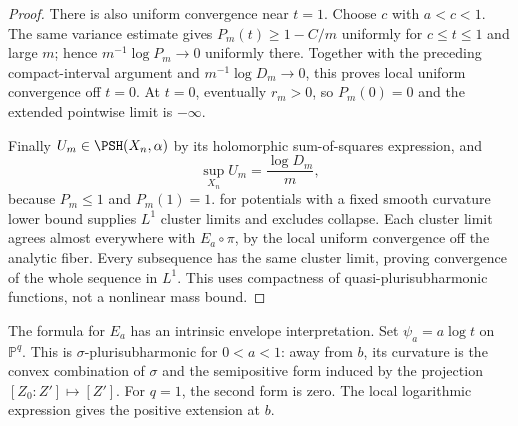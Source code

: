 \begin{proof}
There is also uniform convergence near $t=1$. Choose $c$ with $a<c<1$. The same variance estimate gives $P_m(t)\geq1-C/m$ uniformly for $c\leq t\leq1$ and large $m$; hence $m^{-1}\log P_m\to0$ uniformly there. Together with the preceding compact-interval argument and $m^{-1}\log D_m\to0$, this proves local uniform convergence off $t=0$. At $t=0$, eventually $r_m>0$, so $P_m(0)=0$ and the extended pointwise limit is $-\infty$.

Finally $U_m\in\PSH(X_n,\alpha)$ by its holomorphic sum-of-squares expression, and
\[
 \sup_{X_n}U_m=\frac{\log D_m}{m},
\]
because $P_m\leq1$ and $P_m(1)=1$.  for potentials with a fixed smooth curvature lower bound supplies $L^1$ cluster limits and excludes collapse. Each cluster limit agrees almost everywhere with $E_a\circ\pi$, by the local uniform convergence off the analytic fiber. Every subsequence has the same cluster limit, proving convergence of the whole sequence in $L^1$. This uses compactness of quasi-plurisubharmonic functions, not a nonlinear mass bound.
\end{proof}

The formula for $E_a$ has an intrinsic envelope interpretation. Set $\psi_a=a\log t$ on $\mathbb P^q$. This is $\sigma$-plurisubharmonic for $0<a<1$: away from $b$, its curvature is the convex combination of $\sigma$ and the semipositive form induced by the projection $[Z_0:Z']\mapsto[Z']$. For $q=1$, the second form is zero. The local logarithmic expression gives the positive extension at $b$.

